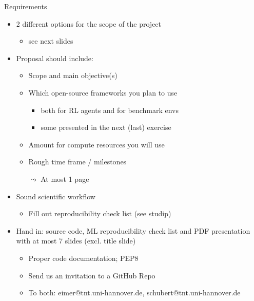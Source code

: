 \documentclass[aspectratio=169]{../latex_main/tntbeamer}  %
\begin{document}
\begin{frame}[c]{Requirements}
	\vspace{-1em}
	\begin{itemize}
		\item 2 different options for the scope of the project 
		\begin{itemize}
			\item see next slides
		\end{itemize}
		\pause
		\item Proposal should include:
			\begin{itemize}
				\item Scope and main objective(s)
				\item Which open-source frameworks you plan to use
				\begin{itemize}
					\item both for RL agents and for benchmark envs
					\item some presented in the next (last) exercise
				\end{itemize}
				\item Amount for compute resources you will use
				\item Rough time frame / milestones
				\item[$\leadsto$] At most 1 page
			\end{itemize}
		\pause
		\item Sound scientific  workflow
		\begin{itemize}
			\item Fill out reproducibility check list (see studip)
		\end{itemize}
		\pause
		\item Hand in: source code, ML reproducibility check list and PDF presentation with at most 7 slides (excl. title slide)
		\begin{itemize}
			\item Proper code documentation; PEP8
			\item Send us an invitation to a GitHub Repo
			\item To both: eimer@tnt.uni-hannover.de, schubert@tnt.uni-hannover.de
		\end{itemize}
	\end{itemize}
	
\end{frame}
\end{document}
